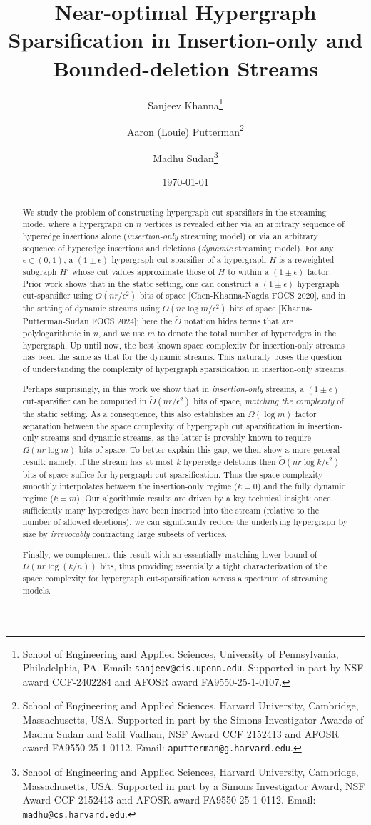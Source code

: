 \documentclass[11pt]{article}
\title{Near-optimal Hypergraph Sparsification in Insertion-only and Bounded-deletion Streams}
\date{\today}
\author{Sanjeev Khanna\thanks{School of Engineering and Applied Sciences, University of Pennsylvania, Philadelphia, PA. Email: {\tt sanjeev@cis.upenn.edu}. Supported in part by NSF award CCF-2402284 and AFOSR award FA9550-25-1-0107.} \and Aaron (Louie) Putterman\thanks{School of Engineering and Applied Sciences, Harvard University, Cambridge, Massachusetts, USA. Supported in part by the Simons Investigator Awards of Madhu Sudan and Salil Vadhan, NSF Award CCF 2152413 and AFOSR award FA9550-25-1-0112. Email: \texttt{aputterman@g.harvard.edu}.} \and Madhu Sudan\thanks{School of Engineering and Applied Sciences, Harvard University, Cambridge, Massachusetts, USA. Supported in part by a Simons Investigator Award, NSF Award CCF 2152413 and AFOSR award FA9550-25-1-0112. Email: \texttt{madhu@cs.harvard.edu}.}}
\theoremstyle{definition}
\begin{document}
\maketitle

\begin{abstract}
We study the problem of constructing hypergraph cut sparsifiers in the streaming model where a hypergraph on $n$ vertices is revealed either via an arbitrary sequence of hyperedge insertions alone ({\em insertion-only} streaming model) or via an arbitrary sequence of hyperedge insertions and deletions ({\em dynamic} streaming model). For any $\epsilon \in (0,1)$, a $(1 \pm \epsilon)$ hypergraph cut-sparsifier of a hypergraph $H$ is a reweighted subgraph $H'$ whose cut values approximate those of $H$ to within a $(1 \pm \epsilon)$ factor. Prior work shows that in the static setting, one can construct a $(1 \pm \epsilon)$ hypergraph cut-sparsifier using $\tilde{O}(nr/\epsilon^2)$ bits of space [Chen-Khanna-Nagda FOCS 2020], and in the setting of dynamic streams using $\tilde{O}(nr\log m/\epsilon^2)$ bits of space [Khanna-Putterman-Sudan FOCS 2024]; here the $\tilde{O}$ notation hides terms that are polylogarithmic in $n$, and we use $m$ to denote the total number of hyperedges in the hypergraph. Up until now, the best known space complexity for insertion-only streams has been the same as that for the dynamic streams. This naturally poses the question of understanding the complexity of hypergraph sparsification in insertion-only streams.

Perhaps surprisingly, in this work we show that in \emph{insertion-only} streams, a $(1 \pm \epsilon)$ cut-sparsifier can be computed in $\tilde{O}(nr/\epsilon^2)$ bits of space, \emph{matching the complexity} of the static setting.
As a consequence, this also establishes an $\Omega(\log m)$ factor separation between the space complexity of hypergraph cut sparsification in insertion-only streams and dynamic streams, as the latter is provably known to require $\Omega(nr \log m)$ bits of space. To better explain this gap, we then show a more general result: namely, if the stream has at most $k$ hyperedge deletions then $\tilde{O}(n r \log k/\epsilon^2)$ bits of space suffice for hypergraph cut sparsification.
Thus the space complexity 
smoothly interpolates between the insertion-only regime ($k=0$) and the fully dynamic regime ($k=m$). 
Our algorithmic results are driven by a key technical insight: once sufficiently many hyperedges have been inserted into the stream (relative to the number of allowed deletions), we can significantly reduce the underlying hypergraph by size by {\em irrevocably} contracting large subsets of vertices.

Finally, we complement this result with an essentially matching lower bound of $\Omega(n r \log(k/n))$ bits, thus providing essentially a tight characterization of the space complexity for hypergraph cut-sparsification across a spectrum of streaming models.

\end{abstract}
\end{document}
